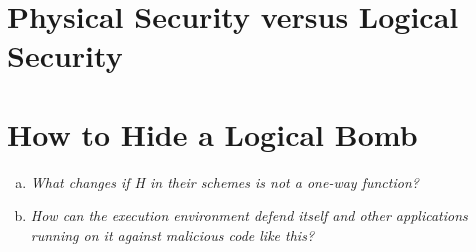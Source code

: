 \documentclass{report}
\begin{document}
	
	\section{Physical Security versus Logical Security}
	\startsection
		\cite{Riordan1998EnvironmentalKG}
	\closesection
	
	\section{How to Hide a Logical Bomb}
	\startsection
		\begin{enumerate}[a)]
			\item \textit{What changes if H in their schemes is not a one-way function?}
			\item \textit{How can the execution environment defend itself and other applications running on it against malicious code like this?}
		\end{enumerate}
	\closesection
	
	{\let\clearpage\relax }
\end{document}
